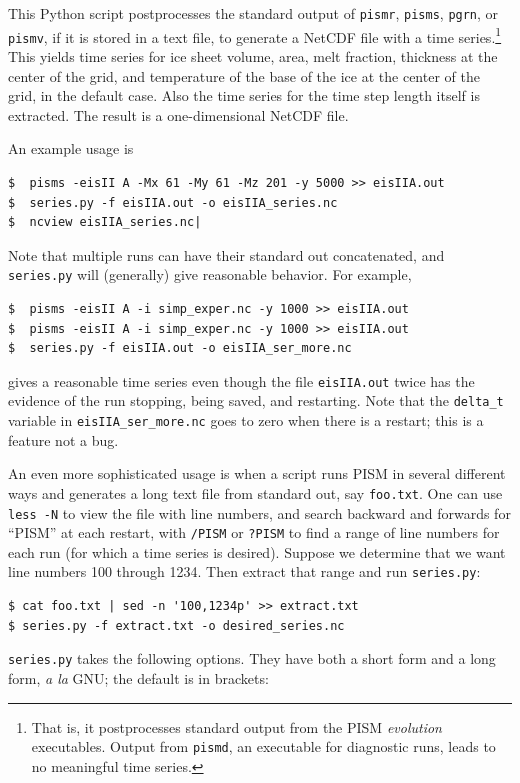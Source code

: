 \documentclass[11pt,final]{amsart}
\begin{document}
  This Python script postprocesses the standard output of \verb|pismr|, \verb|pisms|, \verb|pgrn|, or \verb|pismv|, if it is stored in a text file, to generate a NetCDF file with a time series.\footnote{That is, it postprocesses standard output from the PISM \emph{evolution} executables.  Output from \texttt{pismd}, an executable for diagnostic runs, leads to no meaningful time series.}  This yields time series for ice sheet volume, area, melt fraction, thickness at the center of the grid, and temperature of the base of the ice at the center of the grid, in the default case.  Also the time series for the time step length itself is extracted.  The result is a one-dimensional NetCDF file.

An example usage is

\begin{verbatim}
$  pisms -eisII A -Mx 61 -My 61 -Mz 201 -y 5000 >> eisIIA.out
$  series.py -f eisIIA.out -o eisIIA_series.nc
$  ncview eisIIA_series.nc|
\end{verbatim}
Note that multiple runs can have their standard out concatenated, and \verb|series.py| will (generally) give reasonable behavior.  For example,

\begin{verbatim}
$  pisms -eisII A -i simp_exper.nc -y 1000 >> eisIIA.out
$  pisms -eisII A -i simp_exper.nc -y 1000 >> eisIIA.out
$  series.py -f eisIIA.out -o eisIIA_ser_more.nc
\end{verbatim}
gives a reasonable time series even though the file \verb|eisIIA.out| twice has the evidence of the run stopping, being saved, and restarting.  Note that the \verb|delta_t| variable in \verb|eisIIA_ser_more.nc| goes to zero when there is a restart; this is a feature not a bug.

An even more sophisticated usage is when a script runs PISM in several different ways and generates a long text file from standard out, say \verb|foo.txt|.  One can use \verb|less -N| to view the file with line numbers, and search backward and forwards  for ``PISM'' at each restart, with \verb|/PISM| or  \verb|?PISM| to find a range of line numbers for each run (for which a time series is desired).  Suppose we determine that we want line numbers 100 through 1234.  Then extract that range and run \verb|series.py|:

\begin{verbatim}
$ cat foo.txt | sed -n '100,1234p' >> extract.txt
$ series.py -f extract.txt -o desired_series.nc
\end{verbatim}
\opthead  \verb|series.py| takes the following options.  They have both a short form and a long form, \emph{a la} GNU; the default is in brackets:
\end{document}
